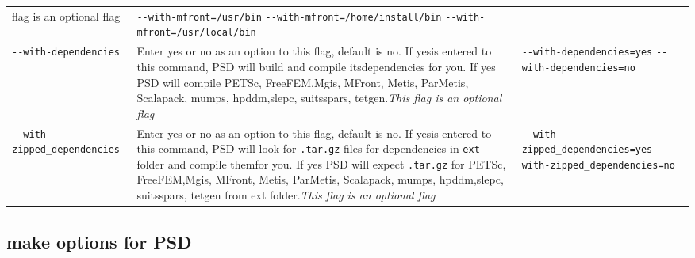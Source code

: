 \begin{longtable}[]{@{}lll@{}}
\begin{minipage}[t]{0.39\columnwidth}
{flag is an optional flag}\strut
\end{minipage} & \begin{minipage}[t]{0.39\columnwidth}\raggedright\strut
\lstinline!--with-mfront=/usr/bin!
\lstinline!--with-mfront=/home/install/bin!
\lstinline!--with-mfront=/usr/local/bin!\strut
\end{minipage}\tabularnewline
\begin{minipage}[t]{0.14\columnwidth}\raggedright\strut
\lstinline!--with-dependencies!\strut
\end{minipage} & \begin{minipage}[t]{0.39\columnwidth}\raggedright\strut
Enter yes or no as an option to this flag, default is no. If yesis
entered to this command, PSD will build and compile itsdependencies for
you. If yes PSD will compile PETSc, FreeFEM,Mgis, MFront, Metis,
ParMetis, Scalapack, mumps, hpddm,slepc, suitsspars, tetgen.\emph{This
flag is an optional flag}\strut
\end{minipage} & \begin{minipage}[t]{0.39\columnwidth}\raggedright\strut
\lstinline!--with-dependencies=yes! \lstinline!--with-dependencies=no!
\strut
\end{minipage}\tabularnewline
\begin{minipage}[t]{0.14\columnwidth}\raggedright\strut
\lstinline!--with-zipped_dependencies!\strut
\end{minipage} & \begin{minipage}[t]{0.39\columnwidth}\raggedright\strut
Enter yes or no as an option to this flag, default is no. If yesis
entered to this command, PSD will look for \lstinline!.tar.gz! files for
dependencies in \lstinline!ext! folder and compile themfor you. If yes
PSD will expect \lstinline!.tar.gz! for PETSc, FreeFEM,Mgis, MFront,
Metis, ParMetis, Scalapack, mumps, hpddm,slepc, suitsspars, tetgen from
ext folder.\emph{This flag is an optional flag}\strut
\end{minipage} & \begin{minipage}[t]{0.39\columnwidth}\raggedright\strut
\lstinline!--with-zipped_dependencies=yes!
\lstinline!--with-zipped_dependencies=no! \strut
\end{minipage}\tabularnewline
\bottomrule
\end{longtable}

\subsection{make options for PSD}

